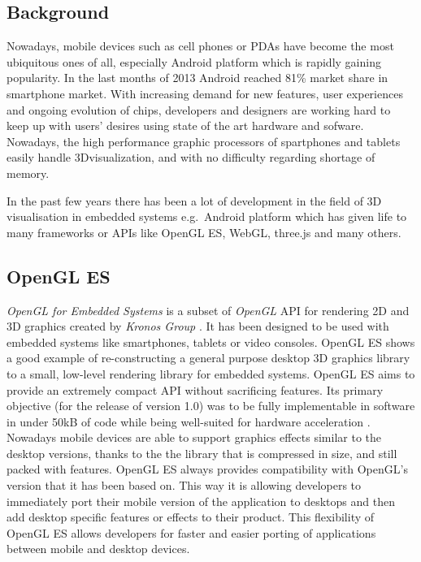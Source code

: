 \subsection{Background}
Nowadays, mobile devices such as cell phones or PDAs have become the most ubiquitous ones of all, especially Android platform which is rapidly gaining popularity.
In the last months of 2013 Android reached 81\% market share in smartphone market.
With increasing demand for new features, user experiences and ongoing evolution of chips,  developers and designers are working hard to keep up with users' desires using state of the art hardware and sofware.
Nowadays, the high performance graphic processors of spartphones and tablets easily handle 3Dvisualization, and with no difficulty regarding shortage of memory.

In the past few years there has been a lot of development in the field of 3D visualisation in embedded systems e.g.\ Android platform which has given life to many frameworks or APIs like OpenGL ES, WebGL, three.js and many others.

\subsection{OpenGL ES}
\emph{OpenGL for Embedded Systems} \cite{opengles_kronos} is a subset of \emph{OpenGL} \cite{opengl_kronos} API for rendering 2D and 3D graphics created by \emph{Kronos Group} \cite{kronos_group}.
It has been designed to be used with embedded systems like smartphones, tablets or video consoles.
OpenGL ES shows a good example of re-constructing a general purpose desktop 3D graphics library to a small, low-level rendering library for embedded systems.
OpenGL ES aims to provide an extremely compact API without sacrificing features.
Its primary objective (for the release of version 1.0) was to be fully implementable in software in under 50kB of code while being well-suited for hardware acceleration \cite{mobile_3d_graphics_with_OGLES_M3G}.
Nowadays mobile devices are able to support graphics effects similar to the desktop versions, thanks to the the library that is compressed in size, and still packed with features.
\newline OpenGL ES always provides compatibility with OpenGL's version that it has been based on.
This way it is allowing developers to immediately port their mobile version of the application to desktops and then add desktop specific features or effects to their product.
This flexibility of OpenGL ES allows developers for faster and easier porting of applications between mobile and desktop devices.

